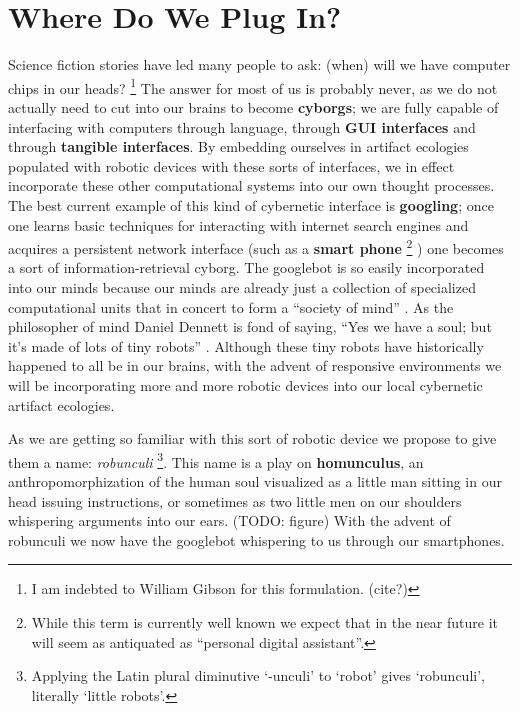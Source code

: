 \section{Where Do We Plug In?}
%
Science fiction stories have led many people to ask: (when) will we have computer chips in our heads?%
\footnote{I am indebted to William Gibson for this formulation. (cite?)} 
The answer for most of us is probably never, as we do not actually need to cut into our brains to become \textbf{cyborgs}; we are fully capable of interfacing with computers through language, through \textbf{GUI interfaces} and through \textbf{tangible interfaces}.
By embedding ourselves in artifact ecologies populated with robotic devices with these sorts of interfaces, we in effect incorporate these other computational systems into our own thought processes.
The best current example of this kind of cybernetic interface is \textbf{googling}; once one learns basic techniques for interacting with internet search engines and acquires a persistent network interface (such as a \textbf{smart phone}%
\footnote{While this term is currently well known we expect that in the near future it will seem as antiquated as ``personal digital assistant''.}
) one becomes a sort of information-retrieval cyborg.
The googlebot is so easily incorporated into our minds because our minds are already just a collection of specialized computational units that in concert to form a ``society of mind'' \citep{society_of_mind}. 
As the philosopher of mind Daniel Dennett is fond of saying, ``Yes we have a soul; but it's made of lots of tiny robots'' \citeyearpar[][p. 1]{freedom_evolves}. Although these tiny robots have historically happened to all be in our brains, with the advent of responsive environments we will be incorporating more and more robotic devices into our local cybernetic artifact ecologies.

As we are getting so familiar with this sort of robotic device we propose to give them a name: \emph{robunculi}%
\footnote{Applying the Latin plural diminutive `-unculi' to `robot' gives `robunculi', literally `little robots'.}.
This name is a play on \textbf{homunculus}, an anthropomorphization of the human soul visualized as a little man sitting in our head issuing instructions, or sometimes as two little men on our shoulders whispering arguments into our ears.
(TODO: figure)
With the advent of robunculi we now have the googlebot whispering to us through our smartphones.

